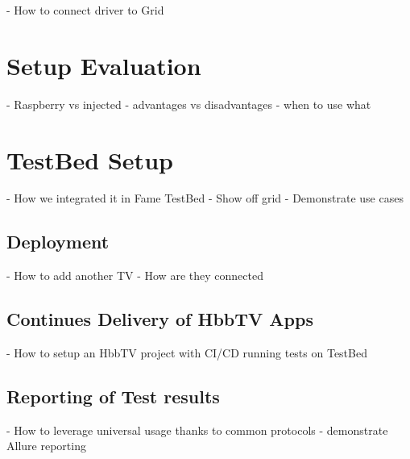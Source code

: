 - How to connect driver to Grid

\section{Setup Evaluation\label{sec:setupevaluation}}

- Raspberry vs injected
- advantages vs disadvantages
- when to use what

\section{TestBed Setup\label{sec:testbed}}

- How we integrated it in Fame TestBed
- Show off grid
- Demonstrate use cases

\subsection{Deployment\label{sec:deployment}}

- How to add another TV
- How are they connected

\subsection{Continues Delivery of HbbTV Apps\label{sec:cicdhbbtvapps}}

- How to setup an HbbTV project with CI/CD running tests on TestBed

\subsection{Reporting of Test results\label{sec:reporting}}

- How to leverage universal usage thanks to common protocols
- demonstrate Allure reporting
